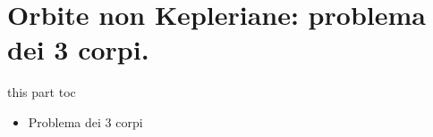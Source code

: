 \documentclass[10pt,xcolor={usenames},fleqn,mathserif,serif]{beamer}
\begin{document}



\part{Orbite non Kepleriane: problema dei 3 corpi.}\label{part:threebody}

\begin{frame}{this part toc}

\begin{itemize}

\item Problema dei 3 corpi

\end{itemize}


\end{frame}



\end{document}
